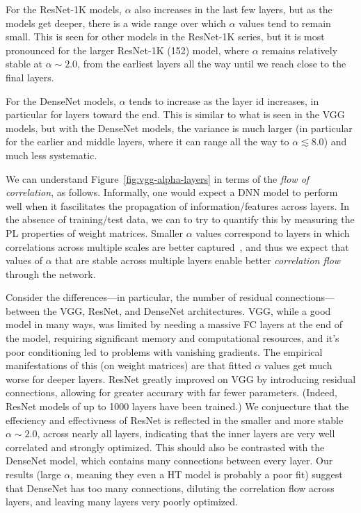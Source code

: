 For the ResNet-1K models, $\alpha$ also increases in the last few layers, but as the models get deeper, there is a wide range over which $\alpha$ values tend to remain small.
This is seen for other models in the ResNet-1K series, but it is most pronounced for the larger ResNet-1K (152) model, where $\alpha$ remains relatively stable at $\alpha\sim 2.0$, from the earliest layers all the way until we reach close to the final layers.  

For the DenseNet models, $\alpha$ tends to increase as the layer id increases, in particular for layers toward the end.
This is similar to what is seen in the VGG models, but with the DenseNet models, the variance is much larger (in particular for the earlier and middle layers, where it can range all the way to $\alpha\lesssim 8.0$) and much less systematic.

We can understand Figure~\ref{fig:vgg-alpha-layers} in terms of the \emph{flow of correlation}, as follows.
Informally, one would expect a DNN model to perform well when it fascilitates the propagation of information/features across layers.
In the absence of training/test data, we can to try to quantify this by measuring the PL properties of weight matrices.
Smaller $\alpha$ values correspond to layers in which correlations across multiple scales are better captured~\cite{MM18_TR,SornetteBook}, and thus we expect that values of $\alpha$ that are stable across multiple layers enable better \emph{correlation flow} through the network.

Consider the differences---in particular, the number of residual connections---between the VGG, ResNet, and DenseNet architectures.
VGG, while a good model in many ways, was limited by needing a massive FC layers at the end of the model, requiring significant memory and computational resources, and it's poor conditioning led to problems with vanishing gradients.  
The empirical manifestations of this (on weight matrices) are that fitted $\alpha$ values get much worse for deeper layers.
ResNet greatly improved on VGG by introducing residual connections, allowing for greater accurary with far fewer parameters.
(Indeed, ResNet models of up to 1000 layers have been trained.) 
We conjuecture that the effeciency and effectivness of ResNet is reflected in the smaller and more stable $\alpha\sim 2.0$, across nearly all layers, indicating that the inner layers are very well correlated and strongly optimized.
This should also be contrasted with the DenseNet model, which contains many connections between every layer.
Our results (large $\alpha$, meaning they even a HT model is probably a poor fit) suggest that DenseNet has too many connections, diluting the correlation flow across layers, and leaving many layers very poorly optimized.


